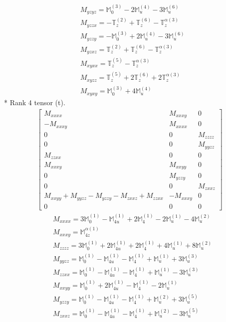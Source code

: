 \documentclass[fleqn,8pt,landscape]{jsarticle}
\begin{document}
\begin{align*}
& M_{yzyz} = \mathbb{M}_{0}^{(3)} - 2 \mathbb{M}_{u}^{(4)} - 3 \mathbb{M}_{u}^{(6)} \\
& M_{yzzx} = - \mathbb{T}_{z}^{(2)} + \mathbb{T}_{z}^{(6)} - \mathbb{T}_{z}^{\alpha(3)} \\
& M_{yzzy} = - \mathbb{M}_{0}^{(3)} + 2 \mathbb{M}_{u}^{(4)} - 3 \mathbb{M}_{u}^{(6)} \\
& M_{yzxz} = \mathbb{T}_{z}^{(2)} + \mathbb{T}_{z}^{(6)} - \mathbb{T}_{z}^{\alpha(3)} \\
& M_{xyxx} = \mathbb{T}_{z}^{(5)} - \mathbb{T}_{z}^{\alpha(3)} \\
& M_{xyzz} = \mathbb{T}_{z}^{(5)} + 2 \mathbb{T}_{z}^{(6)} + 2 \mathbb{T}_{z}^{\alpha(3)} \\
& M_{xyxy} = \mathbb{M}_{0}^{(3)} + 4 \mathbb{M}_{u}^{(4)}
\end{align*}
* Rank 4 tensor (t).
\begin{align*}
\begin{bmatrix} M_{xxxx} & M_{xxxy} & 0 \\ - M_{xxxy} & M_{xxxx} & 0 \\ 0 & 0 & M_{zzzz} \\ 0 & 0 & M_{yyzz} \\ M_{zzxx} & 0 & 0 \\ M_{xxxy} & M_{xxyy} & 0 \\ 0 & M_{yzzy} & 0 \\ 0 & 0 & M_{zxxz} \\ M_{xxyy} + M_{yyzz} - M_{yzzy} - M_{zxxz} + M_{zzxx} & - M_{xxxy} & 0 \\ 0 & 0 & 0 \end{bmatrix}
\end{align*}
\begin{align*}
& M_{xxxx} = 3 \mathbb{M}_{0}^{(1)} - \mathbb{M}_{4u}^{(1)} + 2 \mathbb{M}_{4}^{(1)} - 2 \mathbb{M}_{u}^{(1)} - 4 \mathbb{M}_{u}^{(2)} \\
& M_{xxxy} = \mathbb{M}_{4z}^{\alpha(1)} \\
& M_{zzzz} = 3 \mathbb{M}_{0}^{(1)} + 2 \mathbb{M}_{4u}^{(1)} + 2 \mathbb{M}_{4}^{(1)} + 4 \mathbb{M}_{u}^{(1)} + 8 \mathbb{M}_{u}^{(2)} \\
& M_{yyzz} = \mathbb{M}_{0}^{(1)} - \mathbb{M}_{4u}^{(1)} - \mathbb{M}_{4}^{(1)} + \mathbb{M}_{u}^{(1)} + 3 \mathbb{M}_{u}^{(3)} \\
& M_{zzxx} = \mathbb{M}_{0}^{(1)} - \mathbb{M}_{4u}^{(1)} - \mathbb{M}_{4}^{(1)} + \mathbb{M}_{u}^{(1)} - 3 \mathbb{M}_{u}^{(3)} \\
& M_{xxyy} = \mathbb{M}_{0}^{(1)} + 2 \mathbb{M}_{4u}^{(1)} - \mathbb{M}_{4}^{(1)} - 2 \mathbb{M}_{u}^{(1)} \\
& M_{yzzy} = \mathbb{M}_{0}^{(1)} - \mathbb{M}_{4u}^{(1)} - \mathbb{M}_{4}^{(1)} + \mathbb{M}_{u}^{(2)} + 3 \mathbb{M}_{u}^{(5)} \\
& M_{zxxz} = \mathbb{M}_{0}^{(1)} - \mathbb{M}_{4u}^{(1)} - \mathbb{M}_{4}^{(1)} + \mathbb{M}_{u}^{(2)} - 3 \mathbb{M}_{u}^{(5)}
\end{align*}
\end{document}
